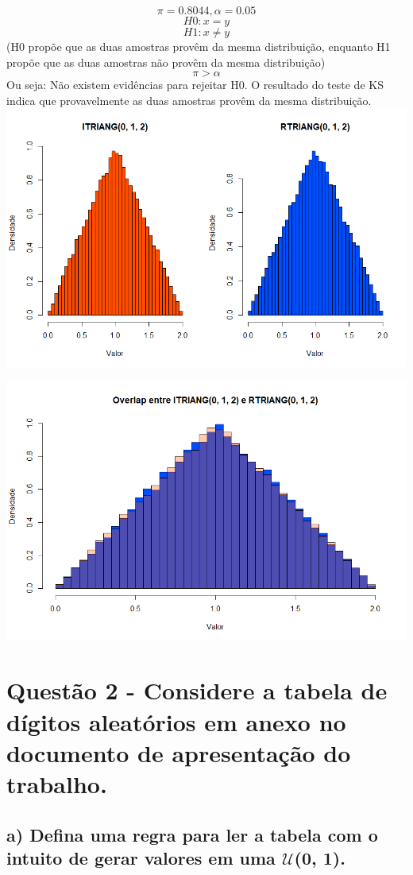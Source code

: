 \documentclass{article}
\begin{document}
\[ \pi = 0.8044, \alpha = 0.05 \]
\[ H0: x = y \]   
\[ H1: x \neq y \]  
(H0 propõe que as duas amostras provêm da mesma distribuição, enquanto H1 propõe que as duas amostras não provêm da mesma distribuição)
\[ \pi > \alpha \]
Ou seja: Não existem evidências para rejeitar H0. O resultado do teste de KS indica que provavelmente as duas amostras provêm da mesma distribuição.
\newpage
\includegraphics[width=1\linewidth]{image2.png}

\includegraphics[width=1\linewidth]{image3.png}

\newpage

\section*{Questão 2 - Considere a tabela de dígitos aleatórios em anexo no documento de apresentação do trabalho.}
\subsection*{a) Defina uma regra para ler a tabela com o intuito de gerar valores em uma $\mathcal{U}$(0, 1).}
\end{document}
